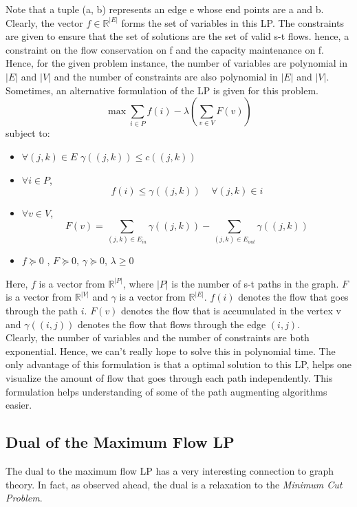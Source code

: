 \documentclass[BTech]{iitmdiss}
\begin{document}
	  Note that a tuple (a, b) represents an edge e whose end points are a and b. \\
	  
	  Clearly, the vector $f \in \mathbb{R}^{|E|}$ forms the set of variables in this LP. The constraints are given to ensure that the set of 
	  solutions are the set of valid s-t flows. hence, a constraint on the flow conservation on f and the capacity maintenance on f. Hence, for the
	  given problem instance, the number of variables are polynomial in $|E|$ and $|V|$ and the number of constraints are also polynomial in $|E|$
	  and $|V|$. \\
	  
	  Sometimes, an alternative formulation of the LP is given for this problem. 
	  $$ \max \displaystyle\sum_{i \in P} f(i) - \lambda (\displaystyle\sum_{v \in V} F(v)) $$
	  subject to:
	  
	  \begin{itemize}
	   \item 
	      $\forall (j,k) \in E$  $\gamma((j,k)) \leq c((j,k))$
	   \item
	      $\forall i \in P$, 
		$$f(i) \leq \gamma((j,k))~~~~~\forall (j,k) \in i$$
	   \item
	      $\forall v \in V$,
	      $$F(v) = \displaystyle\sum_{(j,k) \in E_{in}} \gamma((j,k)) - \displaystyle\sum_{(j,k) \in E_{out}} \gamma((j,k))$$
	   \item
	      $f \succeq 0$ , $F \succeq 0$, $\gamma \succeq 0$, $\lambda \geq 0$
	  \end{itemize}
	  
	  Here, $f$ is a vector from $\mathbb{R}^{|P|}$, where $|P|$ is the number of s-t paths in the graph. $F$ is a vector from $\mathbb{R}^{|V|}$
	  and $\gamma$ is a vector from $\mathbb{R}^{|E|}$. $f(i)$ denotes the flow that goes through the path $i$. $F(v)$ denotes the flow that 
	  is accumulated in the vertex v and $\gamma((i,j))$ denotes the flow that flows through the edge $(i,j)$. \\
	  
	  Clearly, the number of variables and the number of constraints are both exponential. Hence, we can't really hope to solve this in polynomial
	  time. The only advantage of this formulation is that a optimal solution to this LP, helps one visualize the amount of flow that goes through
	  each path independently. This formulation helps understanding of some of the path augmenting algorithms easier.
	
	\subsection{Dual of the Maximum Flow LP}
	  The dual to the maximum flow LP has a very interesting connection to graph theory. In fact, as observed ahead, the dual is a relaxation 
	  to the \textit{Minimum Cut Problem}. \\
	  
\end{document}
